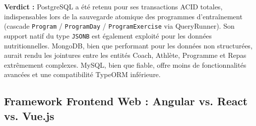 \textbf{Verdict :} PostgreSQL a été retenu pour ses transactions ACID totales, indispensables lors de la sauvegarde atomique des programmes d'entraînement (cascade \texttt{Program} / \texttt{ProgramDay} / \texttt{ProgramExercise} via QueryRunner). Son support natif du type \texttt{JSONB} est également exploité pour les données nutritionnelles. MongoDB, bien que performant pour les données non structurées, aurait rendu les jointures entre les entités Coach, Athlète, Programme et Repas extrêmement complexes. MySQL, bien que fiable, offre moins de fonctionnalités avancées et une compatibilité TypeORM inférieure.

\subsection{Framework Frontend Web : Angular vs. React vs. Vue.js}

\begin{table}[H]
\centering
\renewcommand{\arraystretch}{1.4}
\caption{Comparaison des frameworks frontend -- Justification du choix Angular}
\end{table}

